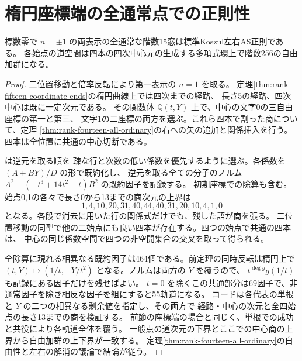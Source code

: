 \section{楕円座標端の全通常点での正則性}
\label{sec:rank-fifteen-coordinate-regularity}
\begin{theorem}\label{thm:rank-fifteen-coordinate-regularity}
標数零で $n=\pm1$ の両表示の全通常な階数15窓は標準Koszul左右AS正則である。
各始点の道空間は四本の四次中心元の生成する多項式環上で階数256の自由加群になる。
\end{theorem}
\begin{proof}
二位置移動と倍率反転により第一表示の $n=1$ を取る。
定理\ref{thm:rank-fifteen-coordinate-ends}の楕円曲線上では四次までの経路、
長さ5の経路、四次中心は既に一定次元である。
その関数体 $\mathbb Q(t,Y)$ 上で、中心の文字0の三自由座標の第一と第三、
文字1の二座標の両方を選ぶ。これら四本で割った商について、定理
\ref{thm:rank-fourteen-all-ordinary}の右への矢の追加と関係挿入を行う。
四本は全位置に共通の中心切断である。

 は逆元を取る順を
疎な行と次数の低い係数を優先するように選ぶ。各係数を $(A+BY)/D$ の形で既約化し、
逆元を取る全ての分子のノルム $A^2-(-t^3+14t^2-t)B^2$ の既約因子を記録する。
初期座標での除算も含む。始点0,1の各々で長さ0から13までの商次元の上界は
\[
 1,4,10,20,31,40,44,40,31,20,10,4,1,0
\]
となる。各段で消去に用いた行の関係式だけでも、残した語が商を張る。
二位置移動の同型で他の二始点にも良い四本が存在する。四つの始点で共通の四本は、
中心の同じ係数空間で四つの非空開集合の交叉を取って得られる。

全除算に現れる相異なる既約因子は464個である。前定理の同時反転は楕円上で
$(t,Y)\mapsto(1/t,-Y/t^2)$ となる。ノルムは両方の $Y$ を覆うので、
$t^{\deg g}g(1/t)$ も記録にある因子だけを残せばよい。
$t=0$ を除くこの共通部分は69因子で、非通常因子を除き相反な因子を組にすると55軌道になる。
コードは各代表の単根と $Y$ の二つの相異なる剰余値を指定し、その両方で
経路・中心の次元と全四始点の長さ13までの商を検証する。
前節の座標端の場合と同じく、単根での成功と共役により各軌道全体を覆う。
一般点の道次元の下界とここでの中心商の上界から自由加群の上下界が一致する。
定理\ref{thm:rank-fourteen-all-ordinary}の自由性と左右の解消の議論で結論が従う。
\end{proof}

